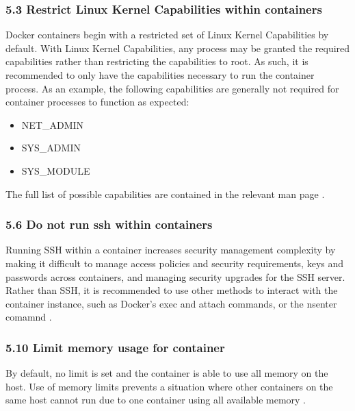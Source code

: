 \subsubsection*{5.3 Restrict Linux Kernel Capabilities within containers} Docker containers begin with a restricted set of Linux Kernel Capabilities by default. With Linux Kernel Capabilities, any process may be granted the required capabilities rather than restricting the capabilities to root. As such, it is recommended to only have the capabilities necessary to run the container process. As an example, the following capabilities are generally not required for container processes to function as expected: \cite[pp 130-1]{center_for_internet_security} 
\begin{itemize}
    \item NET\_ADMIN
    \item SYS\_ADMIN
    \item SYS\_MODULE
\end{itemize}

The full list of possible capabilities are contained in the relevant man page \cite{man_capabilities}.

\subsubsection*{5.6 Do not run ssh within containers} Running SSH within a container increases security management complexity by making it difficult to manage access policies and security requirements, keys and passwords across containers, and managing security upgrades for the SSH server. Rather than SSH, it is recommended to use other methods to interact with the container instance, such as Docker's exec and attach commands, or the nsenter comamnd \cite[pp 135-6]{center_for_internet_security}.


\subsubsection*{5.10 Limit memory usage for container}
By default, no limit is set and the container is able to use all memory on the host. Use of memory limits prevents a situation where other containers on the same host cannot run due to one container using all available memory \cite[pp 142-3]{center_for_internet_security}.


